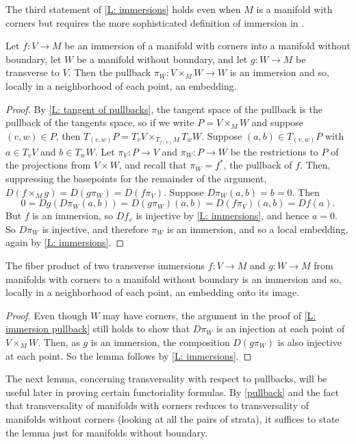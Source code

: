 The third statement of \cref{L: immersions} holds even when $M$ is a manifold with corners but requires the more sophisticated definition of immersion in \cite{MaDo92}.


\begin{lemma}\label{L: immersion pullback}
	Let $f \colon V \to M$ be an immersion of a manifold with corners into a manifold without boundary, let $W$ be a manifold without boundary, and let $g \colon W \to M$ be transverse to $V$. 
	Then the pullback $\pi_W: V \times_M W \to W$ is an immersion and so, locally in a neighborhood of each point, an embedding.
\end{lemma}
\begin{proof}
	By \cref{L: tangent of pullbacks}, the tangent space of the pullback is the pullback of the tangents space, so if we write $P = V \times_M W$ and suppose $(v,w) \in P$, then $T_{(v,w)}P = T_vV \times_{T_{f(v)}M} T_wW$. 
	Suppose $(a,b) \in T_{(v,w)}P$ with $a \in T_vV$ and $b \in T_wW$. 
	Let $\pi_V \colon P \to V$ and $\pi_W \colon P \to W$ be the restrictions to $P$ of the projections from $V \times W$, and recall that $\pi_W = f^*$, the pullback of $f$.
	Then, suppressing the basepoints for the remainder of the argument, $D(f \times_M g) = D(g\pi_W) = D(f \pi_V)$.
	Suppose $D\pi_W(a,b)= b = 0$. 
	Then $$0 = Dg(D\pi_W(a,b))= D(g\pi_W)(a,b) = D(f \pi_V)(a,b) = Df(a).$$
	But $f$ is an immersion, so $Df_v$ is injective by \cref{L: immersions}, and hence $a=0$. 
	So $D\pi_W$ is injective, and therefore $\pi_W$ is an immersion, and so a local embedding, again by \cref{L: immersions}. 
\end{proof}


\begin{lemma}
	The fiber product of two transverse immersions $f \colon V \to M$ and $g \colon W \to M$ from manifolds with corners to a manifold without boundary is an immersion and so, locally in a neighborhood of each point, an embedding onto its image.
\end{lemma}
\begin{proof}
	Even though $W$ may have corners, the argument in the proof of \cref{L: immersion pullback} still holds to show that $D \pi_W$ is an injection at each point of $V \times_M W$. 
	Then, as $g$ is an immersion, the composition $D(g \pi_W)$ is also injective at each point.
	So the lemma follows by \cref{L: immersions}.
\end{proof}

The next lemma, concerning transversality with respect to pullbacks, will be useful later in proving certain functoriality formulas. 
By \cref{pullback} and the fact that transversality of manifolds with corners reduces to transversality of manifolds without corners (looking at all the pairs of strata), it suffices to state the lemma just for manifolds without boundary.

